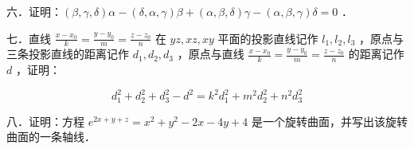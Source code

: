 \documentclass{article}
\begin{document}
六．证明：\((\beta, \gamma, \delta) \alpha-(\delta, \alpha, \gamma) \beta+(\alpha, \beta, \delta) \gamma-(\alpha, \beta, \gamma) \delta=0\) ．

七．直线 \(\frac{x-x_{0}}{k}=\frac{y-y_{0}}{m}=\frac{z-z_{0}}{n}\) 在 \(y z, x z, x y\) 平面的投影直线记作 \(l_{1}, l_{2}, l_{3}\) ，原点与三条投影直线的距离记作 \(d_{1}, d_{2}, d_{3}\) ，原点与直线 \(\frac{x-x_{0}}{k}=\frac{y-y_{0}}{m}=\frac{z-z_{0}}{n}\) 的距离记作 \(d\) ，证明：

\[
d_{1}^{2}+d_{2}^{2}+d_{3}^{2}-d^{2}=k^{2} d_{1}^{2}+m^{2} d_{2}^{2}+n^{2} d_{3}^{2}
\]

八．证明：方程 \(e^{2 x+y+z}=x^{2}+y^{2}-2 x-4 y+4\) 是一个旋转曲面，并写出该旋转曲面的一条轴线．
\end{document}
